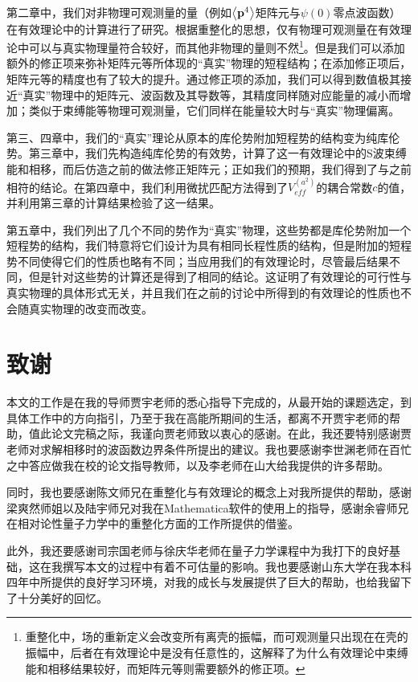 \documentclass[cs4size,titlepage,twoside]{ctexart}
\begin{document}
第二章中，我们对非物理可观测量的量（例如$\expval{\vb{p}^4}$矩阵元与$\psi(0)$零点波函数）在有效理论中的计算进行了研究。根据重整化的思想，仅有物理可观测量在有效理论中可以与真实物理量符合较好，而其他非物理的量则不然\footnote{重整化中，场的重新定义会改变所有离壳的振幅，而可观测量只出现在在壳的振幅中，后者在有效理论中是没有任意性的\cite{vanKolck:1999mw}，这解释了为什么有效理论中束缚能和相移结果较好，而矩阵元等则需要额外的修正项。}。但是我们可以添加额外的修正项来弥补矩阵元等所体现的“真实”物理的短程结构；在添加修正项后，矩阵元等的精度也有了较大的提升。通过修正项的添加，我们可以得到数值极其接近“真实”物理中的矩阵元、波函数及其导数等，其精度同样随对应能量的减小而增加；类似于束缚能等物理可观测量，它们同样在能量较大时与“真实”物理偏离。

第三、四章中，我们的“真实”理论从原本的库伦势附加短程势的结构变为纯库伦势。第三章中，我们先构造纯库伦势的有效势，计算了这一有效理论中的S波束缚能和相移，而后仿造之前的做法修正矩阵元；正如我们的预期，我们得到了与之前相符的结论。在第四章中，我们利用微扰匹配方法得到了$V_{eff}^{(a^2)}$的耦合常数$c$的值，并利用第三章的计算结果检验了这一结果。

第五章中，我们列出了几个不同的势作为“真实”物理，这些势都是库伦势附加一个短程势的结构，我们特意将它们设计为具有相同长程性质的结构，但是附加的短程势不同使得它们的性质也略有不同；当应用我们的有效理论时，尽管最后结果不同，但是针对这些势的计算还是得到了相同的结论。这证明了有效理论的可行性与真实物理的具体形式无关，并且我们在之前的讨论中所得到的有效理论的性质也不会随真实物理的改变而改变。

\cleardoublepage
{}
\section*{致谢}
本文的工作是在我的导师贾宇老师的悉心指导下完成的，从最开始的课题选定，到具体工作中的方向指引，乃至于我在高能所期间的生活，都离不开贾宇老师的帮助，值此论文完稿之际，我谨向贾老师致以衷心的感谢。在此，我还要特别感谢贾老师对求解相移时的波函数边界条件所提出的建议。我也要感谢李世渊老师在百忙之中答应做我在校的论文指导教师，以及李老师在山大给我提供的许多帮助。

同时，我也要感谢陈文师兄在重整化与有效理论的概念上对我所提供的帮助，感谢梁爽然师姐以及陆宇师兄对我在Mathematica软件的使用上的指导，感谢余睿师兄在相对论性量子力学中的重整化方面的工作所提供的借鉴。

此外，我还要感谢司宗国老师与徐庆华老师在量子力学课程中为我打下的良好基础，这在我撰写本文的过程中有着不可估量的影响。我也要感谢山东大学在我本科四年中所提供的良好学习环境，对我的成长与发展提供了巨大的帮助，也给我留下了十分美好的回忆。
\end{document}
